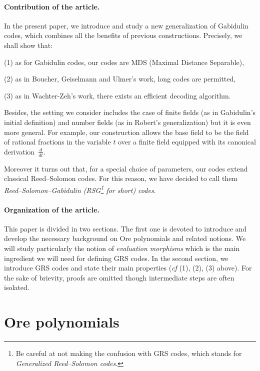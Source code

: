\documentclass[a4paper]{llncs}
\begin{document}
\paragraph{Contribution of the article.}

In the present paper, we introduce and study a new generalization 
of Gabidulin codes, which combines all the benefits of previous 
constructions. Precisely, we shall show that:

\noindent
(1) as for Gabidulin codes, our codes are MDS (Maximal Distance
Separable),

\noindent
(2) as in Boucher, Geiselmann and Ulmer's work, long codes are 
permitted,

\noindent
(3) as in Wachter-Zeh's work, there exists an efficient decoding 
algorithm.

\smallskip

\noindent 
Besides, the setting we consider includes the case of finite fields (as 
in Gabidulin's initial definition) and number fields (as in Robert's 
generalization) but it is even more general. 
For example, our construction allows the base field to be the field of 
rational fractions in the variable $t$ over a finite field equipped with 
its canonical derivation~$\frac d{dt}$.

Moreover it turns out that, for a special choice of parameters, our 
codes extend classical Reed--Solomon codes. For this reason, we have 
decided to call them \emph{Reed--Solomon--Gabidulin (RSG\footnote{Be 
careful at not making the confusion with GRS codes, which stands for 
\emph{Generalized Reed--Solomon codes}.} for short) codes}.

\paragraph{Organization of the article.}

This paper is divided in two sections. 
The first one is devoted to introduce and develop the necessary 
background on Ore polynomials and related notions. We will study
particularly the notion of \emph{evaluation morphisms} which is 
the main ingredient we will need for defining GRS codes.
In the second section, we introduce GRS codes and state their main 
properties (\emph{cf} (1), (2), (3) above). For the sake of brievity, 
proofs are omitted though intermediate steps are often isolated.

\section{Ore polynomials}
\end{document}
